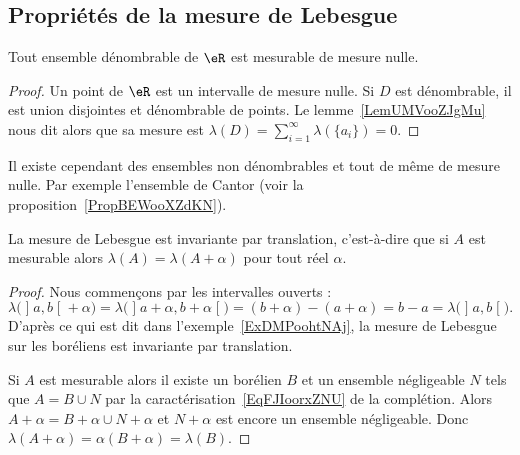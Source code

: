 \subsection{Propriétés de la mesure de Lebesgue}

\begin{proposition}
	Tout ensemble dénombrable de \( \eR\) est mesurable de mesure nulle.
\end{proposition}

\begin{proof}
	Un point de \( \eR\) est un intervalle de mesure nulle. Si \( D\) est dénombrable, il est union disjointes et dénombrable de points. Le lemme~\ref{LemUMVooZJgMu} nous dit alors que sa mesure est \( \lambda(D)=\sum_{i=1}^{\infty}\lambda(\{ a_i \})=0\).
\end{proof}

\begin{remark}
	Il existe cependant des ensembles non dénombrables et tout de même de mesure nulle. Par exemple l'ensemble de Cantor (voir la proposition~\ref{PropBEWooXZdKN}).
\end{remark}


\begin{proposition}     \label{PropooOACLooLMIUuY}
	La mesure de Lebesgue est invariante par translation, c'est-à-dire que si \( A\) est mesurable alors \( \lambda(A)=\lambda(A+\alpha)\) pour tout réel \( \alpha\).
\end{proposition}

\begin{proof}
	Nous commençons par les intervalles ouverts :
	\begin{equation}
		\lambda\big( \mathopen] a , b \mathclose[+\alpha \big)=\lambda\big( \mathopen] a+\alpha , b+\alpha \mathclose[ \big)=(b+\alpha)-(a+\alpha)=b-a=\lambda\big( \mathopen] a , b \mathclose[ \big).
	\end{equation}
	D'après ce qui est dit dans l'exemple~\ref{ExDMPoohtNAj}, la mesure de Lebesgue sur les boréliens est invariante par translation.

	Si \( A\) est mesurable alors il existe un borélien \( B\) et un ensemble négligeable \( N\) tels que \( A=B\cup N\) par la caractérisation~\ref{EqFJIoorxZNU} de la complétion. Alors \( A+\alpha=B+\alpha\cup N+\alpha\) et \( N+\alpha\) est encore un ensemble négligeable. Donc \( \lambda(A+\alpha)=\alpha(B+\alpha)=\lambda(B)\).
\end{proof}

